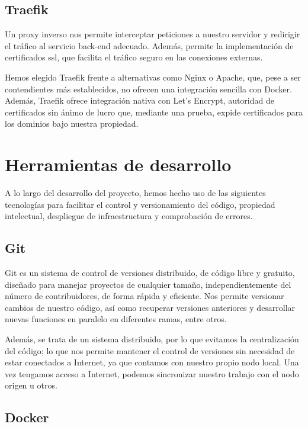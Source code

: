 \subsection{Traefik}
\label{tec_hab:traefik}

Un proxy inverso nos permite interceptar peticiones a nuestro servidor y redirigir el tráfico al servicio back-end adecuado. Además, permite la implementación de certificados \acrshort{ssl}, que facilita el tráfico seguro en las conexiones externas.

Hemos elegido Traefik frente a alternativas como Nginx o Apache, que, pese a ser contendientes más establecidos, no ofrecen una integración sencilla con Docker. Además, Traefik ofrece integración nativa con Let's Encrypt, autoridad de certificados sin ánimo de lucro que, mediante una prueba, expide certificados para los dominios bajo nuestra propiedad.


\section{Herramientas de desarrollo}
\label{tec_hab:project}

A lo largo del desarrollo del proyecto, hemos hecho uso de las siguientes tecnologías para facilitar el control y versionamiento del código, propiedad intelectual, despliegue de infraestructura y comprobación de errores.

\subsection{Git}
\label{tec_hab:git}

Git es un sistema de control de versiones distribuido, de código libre y gratuito, diseñado para manejar proyectos de cualquier tamaño, independientemente del número de contribuidores, de forma rápida y eficiente. Nos permite versionar cambios de nuestro código, así como recuperar versiones anteriores y desarrollar nuevas funciones en paralelo en diferentes ramas, entre otros.

Además, se trata de un sistema distribuido, por lo que evitamos la centralización del código; lo que nos permite mantener el control de versiones sin necesidad de estar conectados a Internet, ya que contamos con nuestro propio nodo local. Una vez tengamos acceso a Internet, podemos sincronizar nuestro trabajo con el nodo origen u otros.


\subsection{Docker}
\label{tec_hab:docker}

